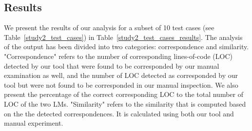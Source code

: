 
\subsection{Results}  \label{study2-results}
We present the results of our analysis for a subset of 10 test cases (see Table~\ref{study2_test_cases}) in Table~\ref{study2_test_cases_results}. The analysis of the output has been divided into two categories: correspondence and similarity. "Correspondence" refers to the number of corresponding lines-of-code (LOC) detected by our tool that were found to be corresponded by our manual examination as well, and the number of LOC detected as corresponded by our tool but were not found to be corresponded in our manual inspection. We also present the percentage of the correct corresponding LOC to the total number of LOC of the two LMs. "Similarity" refers to the similarity that is computed based on the the detected correspondences. It is calculated using both our tool and manual experiment.



